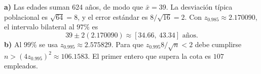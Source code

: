 \textbf{a)} Las edades suman 624 años, de modo que
$\bar x=39$. La desviación típica poblacional es $\sqrt{64}=8$,
y el error estándar es $8/\sqrt{16}=2$. Con $z_{0.985}\approx2.170090$,
el intervalo bilateral al $97\%$ es
\[
39\pm2(2.170090)\approx\boxed{[34.66,\ 43.34]\text{ años}}.
\]
\textbf{b)} Al $99\%$ se usa $z_{0.995}\approx2.575829$.
Para que $z_{0.995}8/\sqrt n<2$ debe cumplirse
$n>(4z_{0.995})^2\approx106.1583$.
El primer entero que supera la cota es $\boxed{107}$ empleados.
